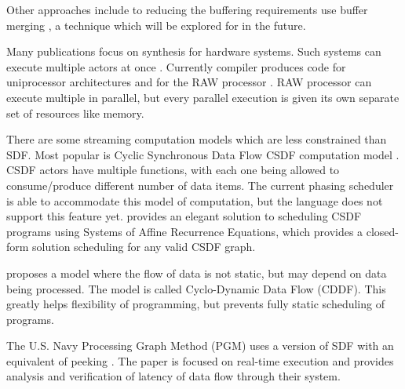 Other approaches include to reducing the buffering requirements
use buffer merging \cite{murthy99buffer}, a technique which will
be explored for {\StreamIt} in the future.

Many publications focus on synthesis for hardware systems.  Such
systems can execute multiple actors at once
\cite{govindarajan-minimizing}.  Currently {\StreamIt} compiler
produces code for uniprocessor architectures \cite{streamittech2}
and for the RAW processor \cite{gordo-thesis}.  RAW processor can
execute multiple {\filters} in parallel, but every parallel
execution is given its own separate set of resources like memory.

There are some streaming computation models which are less
constrained than SDF. Most popular is Cyclic Synchronous Data Flow
CSDF computation model \cite{parks95comparison}.  CSDF actors have
multiple {\work} functions, with each one being allowed to
consume/produce different number of data items. The current
{\StreamIt} phasing scheduler is able to accommodate this model of
computation, but the {\StreamIt} language does not support this
feature yet. \cite{streamittech3} provides an elegant solution to
scheduling CSDF programs using Systems of Affine Recurrence
Equations, which provides a closed-form solution scheduling for
any valid CSDF graph.

\cite{wauters96cyclodynamic} proposes a model where the flow of
data is not static, but may depend on data being processed. The
model is called Cyclo-Dynamic Data Flow (CDDF). This greatly helps
flexibility of programming, but prevents fully static scheduling
of programs.

The U.S. Navy Processing Graph Method (PGM) uses a version of SDF
with an equivalent of peeking \cite{goddard00navy}. The paper is
focused on real-time execution and provides analysis and
verification of latency of data flow through their system.
